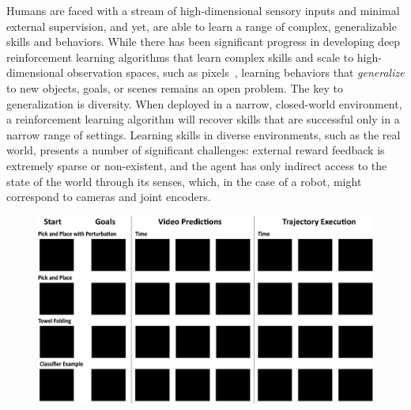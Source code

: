 
Humans are faced with a stream of high-dimensional sensory inputs and minimal external supervision, and yet, are able to learn a range of complex, generalizable skills and behaviors.
While there has been significant progress in developing deep reinforcement learning algorithms that learn complex skills and scale to high-dimensional observation spaces, such as pixels~\cite{tdgammon,atari,e2e,alphago}, learning behaviors that \emph{generalize} to new objects, goals, or scenes remains an open problem.
The key to generalization is diversity. When deployed in a narrow, closed-world environment, a reinforcement learning algorithm will recover skills that are successful only in a narrow range of settings. 
Learning skills in diverse  environments, such as the real world, presents a number of significant challenges: external reward feedback is extremely sparse or non-existent, and the agent has only indirect access to the state of the world through its senses, which, in the case of a robot, might correspond to cameras and joint encoders.

\begin{figure}[t]
	\centering
	\includegraphics[width=1\columnwidth,trim={0mm 0 0 0},clip]{images_general/tile_rough.png}
	\caption{\small{}}
	\label{fig:example_traj}
\end{figure}

